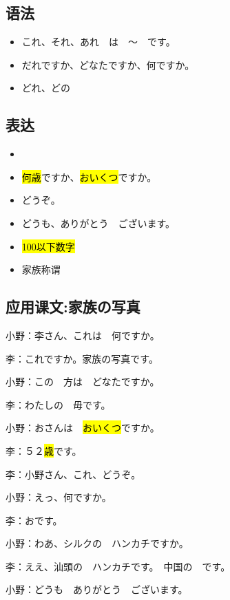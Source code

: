 \subsection{语法}

\begin{itemize}
    \item これ、それ、あれ　は　〜　です。
    \item だれですか、どなたですか、何ですか。
    \item どれ、どの
\end{itemize}


\subsection{表达}

\begin{itemize}
    \item {}
    \item \hl{何歳}ですか、\hl{おいくつ}ですか。
    \item どうぞ。
    \item どうも、ありがとう　ございます。
    \item \hl{100以下数字}
    \item 家族称谓
\end{itemize}

\subsection{应用课文:家族の写真}

小野：李さん、これは　何ですか。

李：これですか。家族の写真です。

小野：この　方は　どなたですか。

李：わたしの　毋です。

小野：おさんは　\hl{おいくつ}ですか。

李：５２\hl{歳}です。

\vspace{1em}

李：小野さん、これ、どうぞ。

小野：えっ、何ですか。

李：お\hl{}です。

小野：わあ、シルクの　ハンカチですか。

李：ええ、汕頭の　ハンカチです。　中国の　\hl{}です。

小野：どうも　ありがとう　ございます。


